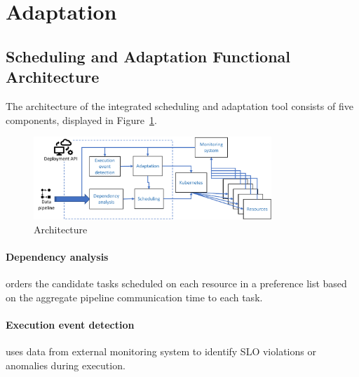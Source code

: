   



  

  



  

\section{Adaptation}
    \subsection{Scheduling and Adaptation Functional Architecture}
        The architecture of the integrated \SAA{} scheduling and adaptation tool consists of five components, displayed in Figure~\ref{fig:data-cloud-architecture}.

        \begin{figure}
            \centering
            \includegraphics[width=0.8\textwidth]{pdf/data_cloud_arch.pdf}
            \caption{\SAA Architecture}
            \label{fig:data-cloud-architecture}
        \end{figure}

        \paragraph{Dependency analysis } orders the candidate tasks scheduled on each resource in a preference list based on the aggregate pipeline communication time to each task.

        \paragraph{Execution event detection } uses data from external monitoring system to identify SLO violations or anomalies during execution.

